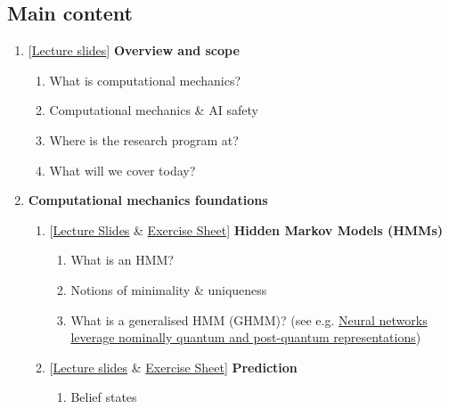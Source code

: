 \documentclass[11pt]{article}
\begin{document}
\subsection{Main content}\label{main-content}

\begin{enumerate}
\item
  {[}\href{https://iliad-intensive.org/downloads/computational-mechanics/computational-mechanics-slides.pdf}{Lecture slides}{]} \textbf{Overview and scope}
  \begin{enumerate}
  \item
    What is computational mechanics?
  \item
    Computational mechanics \& AI safety
  \item
    Where is the research program at?
  \item
    What will we cover today?
  \end{enumerate}
\item
  \textbf{Computational mechanics foundations}
  \begin{enumerate}
  \item
    {[}\href{https://iliad-intensive.org/downloads/computational-mechanics/computational-mechanics-slides.pdf}{Lecture Slides} \& \hyperref[hidden-markov-models]{{Exercise Sheet}}{]} \textbf{Hidden Markov Models (HMMs)}
    \begin{enumerate}
    \item
      What is an HMM?
    \item
      Notions of minimality \& uniqueness
    \item
      What is a generalised HMM (GHMM)? (see e.g. \href{https://arxiv.org/pdf/2507.07432}{Neural networks leverage nominally quantum and post-quantum representations})
    \end{enumerate}
  \item
    {[}\href{https://drive.google.com/file/d/1IPz8Pq939VbjmVqYcYDybdJ02yvdgMGS/view?usp=sharing}{Lecture slides} \& \hyperref[prediction]{{Exercise Sheet}}{]} \textbf{Prediction}
    \begin{enumerate}
    \item
      Belief states

\end{enumerate}
\end{enumerate}
\end{enumerate}
\end{document}
